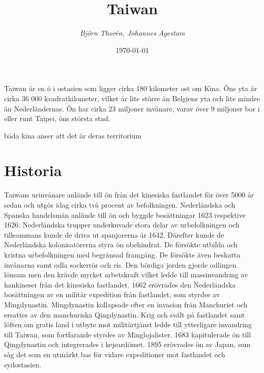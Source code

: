 \documentclass[a4paper,10pt]{article}
\title{\Huge\bf{Taiwan}\\}
\author{\emph{Björn Thorén, Johannes Agestam}}
\date{\today}
\begin{document}
\maketitle




Taiwan är en ö i ostasien som ligger cirka 180 kilometer ost om Kina. Öns yta är cirka 36 000 kvadratkilometer, vilket är lite större än Belgiens yta och lite mindre än Nederländernas. Ön har cirka 23 miljoner invånare, varav över 9 miljoner bor i eller runt Taipei, öns största stad. 

båda kina anser att det är deras territorium



\section*{Historia}
Taiwans urinvånare anlände till ön från det kinesiska fastlandet för över 5000 år sedan och utgör idag cirka två procent av befolkningen. Nederländska och Spanska handelsmän anlände till ön och byggde bosättningar 1623 respektive 1626. Nederländska trupper underkuvade stora delar av urbefolkningen och tillsammans kunde de driva ut spanjorerna år 1642. Därefter kunde de Nederländska kolonisatörerna styra ön obehindrat. De försökte utbilda och kristna urbefolkningen med begränsad framgång. De försökte även beskatta invånarna samt odla sockerrör och ris. Den bördiga jorden gjorde odlingen lönsam men den krävde mycket arbetskraft vilket ledde till massinvandring av hankineser från det kinesiska fastlandet. 1662 erövrades den Nederländska bosättningen av en militär expedition från fastlandet, som styrdes av Mingdynastin. Mingdynastin kollapsade efter en invasion från Manchuriet och ersattes av den manchuriska Qingdynastin. Krig och svält på fastlandet samt löften om gratis land i utbyte mot militärtjänst ledde till ytterligare invandring till Taiwan, som fortfarande styrdes av Minglojalister. 1683 kapitulerade ön till Qingdynastin och integrerades i kejsardömet. 1895 erövrades ön av Japan, som såg det som en utmärkt bas för vidare expeditioner mot fastlandet och sydostasien.
\end{document}
